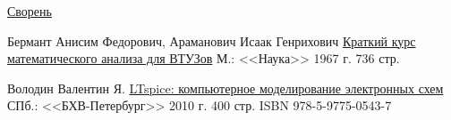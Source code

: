 \begin{thebibliography}{99}

\href{https://drive.google.com/file/d/0B0u4WeMjO894YzEtMEFFY3FXSDQ/edit?usp=sharing}{Сворень}

Бермант Анисим Федорович, 
Араманович Исаак Генрихович
\href{https://drive.google.com/file/d/0B0u4WeMjO894RnU2YU5ldUE5eW8/edit?usp=sharing}{Краткий
курс математического анализа для ВТУЗов}
М.: <<Наука>>
1967 г.
736 стр.

Володин Валентин Я.
\href{https://drive.google.com/file/d/0B0u4WeMjO894ellyU0NQWHNPaFk/edit?usp=sharing}{LTspice:
компьютерное моделирование электронных схем} 
СПб.: <<БХВ-Петербург>>
2010 г.
400 стр.
ISBN 978-5-9775-0543-7

\end{thebibliography}
